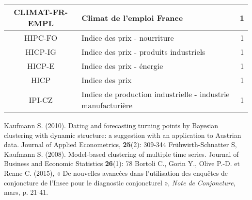 \documentclass[10pt,french,french]{article}
\begin{document}
\begin{center}
\begin{tabular}{ | c | l | c|}
     CLIMAT-FR-EMPL & Climat de l'emploi France  & 1 \\ \hline
     HIPC-FO & Indice des prix - nourriture & 1 \\ \hline
     HICP-IG & Indice des prix - produits industriels & 1 \\ \hline
     HICP-E & Indice des prix - énergie & 1 \\ \hline
     HICP & Indice des prix & 1 \\ \hline
     IPI-CZ & Indice de production industrielle - industrie manufacturière & 1 \\
     \hline
   \end{tabular}
   \label{tableau_var}
 \end{center}

\newpage

\nocite{*}

\begin{thebibliography}{999}
 Kaufmann S. (2010). Dating and forecasting turning points by Bayesian clustering with dynamic structure: a suggestion with an application to Austrian data. Journal of Applied Econometrics, \textbf{25}(2): 309-344 
 Frühwirth-Schnatter S, Kaufmann S. (2008). Model-based clustering of multiple time series. Journal of Business and Economic Statistics \textbf{26}(1): 78
 Bortoli C., Gorin Y., Olive P.-D. et Renne C. (2015), « De nouvelles avancées dans l’utilisation des enquêtes de conjoncture de l’Insee pour le diagnostic conjoncturel », \emph{Note de Conjoncture}, mars, p. 21-41.
\end{thebibliography}
\end{document}
